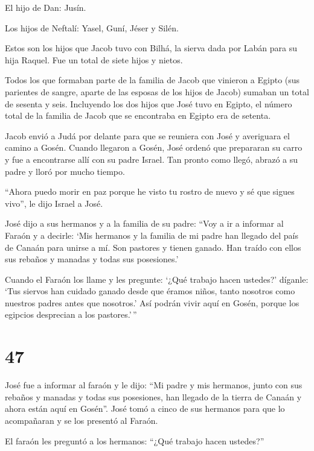  El hijo de Dan: Jusín.

 Los hijos de Neftalí: Yasel, Guní, Jéser y Silén.

 Estos son los hijos que Jacob tuvo con Bilhá, la sierva
dada por Labán para su hija Raquel. Fue un total de siete hijos y
nietos.

 Todos los que formaban parte de la familia de Jacob que
vinieron a Egipto (sus parientes de sangre, aparte de las esposas de los
hijos de Jacob) sumaban un total de sesenta y seis. 
Incluyendo los dos hijos que José tuvo en Egipto, el número total de la
familia de Jacob que se encontraba en Egipto era de setenta.

 Jacob envió a Judá por delante para que se reuniera con
José y averiguara el camino a Gosén. Cuando llegaron a Gosén,
 José ordenó que prepararan su carro y fue a encontrarse
allí con su padre Israel. Tan pronto como llegó, abrazó a su padre y
lloró por mucho tiempo.

 ``Ahora puedo morir en paz porque he visto tu rostro de
nuevo y sé que sigues vivo'', le dijo Israel a José.

 José dijo a sus hermanos y a la familia de su padre: ``Voy
a ir a informar al Faraón y a decirle: `Mis hermanos y la familia de mi
padre han llegado del país de Canaán para unirse a mí.  Son
pastores y tienen ganado. Han traído con ellos sus rebaños y manadas y
todas sus posesiones.'

 Cuando el Faraón los llame y les pregunte: `¿Qué trabajo
hacen ustedes?'  díganle: `Tus siervos han cuidado ganado
desde que éramos niños, tanto nosotros como nuestros padres antes que
nosotros.' Así podrán vivir aquí en Gosén, porque los egipcios
desprecian a los pastores.'\,''

\hypertarget{section-46}{%
\section{47}\label{section-46}}

 José fue a informar al faraón y le dijo: ``Mi padre y mis
hermanos, junto con sus rebaños y manadas y todas sus posesiones, han
llegado de la tierra de Canaán y ahora están aquí en Gosén''.
 José tomó a cinco de sus hermanos para que lo acompañaran y
se los presentó al Faraón.

 El faraón les preguntó a los hermanos: ``¿Qué trabajo hacen
ustedes?''

